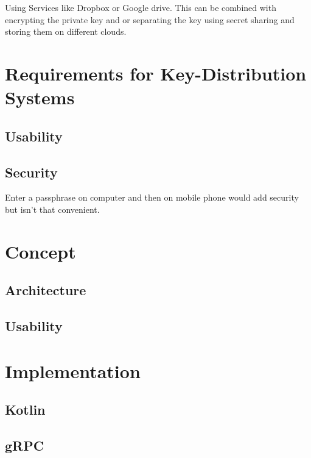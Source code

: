 \documentclass[12pt,twoside,a4paper,parskip]{scrbook}
\begin{document}
Using Services like Dropbox or Google drive. This can be combined with encrypting the private key and or separating the key using secret sharing and 
storing them on different clouds. 




\chapter{Requirements for Key-Distribution Systems}

\section{Usability}

\section{Security}

Enter a passphrase on computer and then on mobile phone would add security but isn't that convenient.

\chapter{Concept}

\section{Architecture}

\section{Usability}

\chapter{Implementation}

\section{Kotlin}

\section{gRPC}
\end{document}
